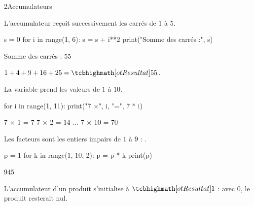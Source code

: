\begin{corrige}{2}{Accumulateurs}
\begin{questions}
  \item L'accumulateur reçoit successivement les carrés de $1$ à $5$.
\begin{codecote}[0.5]
\begin{pythoncol}
s = 0
for i in range(1, 6):
    s = s + i**2
print("Somme des carrés :", s)
\end{pythoncol}
\cote
\begin{consolecol}
Somme des carrés : 55
\end{consolecol}

\medskip
$1+4+9+16+25=\res{55}$.
\end{codecote}
  \item La variable  prend les valeurs de $1$ à $10$.
\begin{codecote}[0.5]
\begin{pythoncol}
for i in range(1, 11):
    print("7 ×", i, "=", 7 * i)
\end{pythoncol}
\cote
\begin{consolecol}
7 × 1 = 7
7 × 2 = 14
...
7 × 10 = 70
\end{consolecol}
\end{codecote}
  \item Les facteurs sont les entiers impairs de $1$ à $9$ : .
\begin{codecote}[0.44]
\begin{pythoncol}
p = 1
for k in range(1, 10, 2):
    p = p * k
print(p)
\end{pythoncol}
\cote
\begin{consolecol}
945
\end{consolecol}

\medskip
L'accumulateur d'un produit s'initialise à $\res{1}$ : avec $0$, le produit resterait nul.
\end{codecote}
\end{questions}
\end{corrige}

